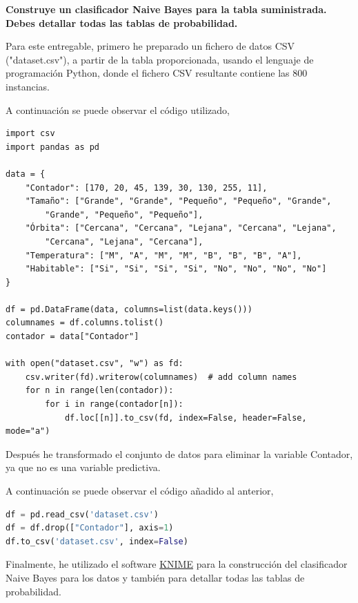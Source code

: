 \documentclass[11pt]{exam}
\begin{document}
\begin{questions}
	
{\bf \question Construye un clasificador Naive Bayes para la tabla suministrada. Debes detallar todas las tablas de probabilidad.}

Para este entregable, primero he preparado un fichero de datos CSV ("dataset.csv"), a partir de la tabla proporcionada, usando el lenguaje de programación Python, donde el fichero CSV resultante contiene las 800 instancias.

A continuación se puede observar el código utilizado,

\newpage

\begin{lstlisting}[basicstyle=\small, tabsize=2]
import csv
import pandas as pd

data = {
	"Contador": [170, 20, 45, 139, 30, 130, 255, 11],
	"Tamaño": ["Grande", "Grande", "Pequeño", "Pequeño", "Grande", 
		"Grande", "Pequeño", "Pequeño"],
	"Órbita": ["Cercana", "Cercana", "Lejana", "Cercana", "Lejana", 
		"Cercana", "Lejana", "Cercana"],
	"Temperatura": ["M", "A", "M", "M", "B", "B", "B", "A"],
	"Habitable": ["Si", "Si", "Si", "Si", "No", "No", "No", "No"]
}

df = pd.DataFrame(data, columns=list(data.keys()))
columnames = df.columns.tolist()
contador = data["Contador"]

with open("dataset.csv", "w") as fd:
	csv.writer(fd).writerow(columnames)  # add column names
	for n in range(len(contador)):
		for i in range(contador[n]):
			df.loc[[n]].to_csv(fd, index=False, header=False, mode="a")
\end{lstlisting}

Después he transformado el conjunto de datos para eliminar la variable Contador, ya que no es una variable predictiva.

A continuación se puede observar el código añadido al anterior,

\begin{lstlisting}[language=Python, basicstyle=\small, tabsize=2]
df = pd.read_csv('dataset.csv')
df = df.drop(["Contador"], axis=1)
df.to_csv('dataset.csv', index=False)
\end{lstlisting}

Finalmente, he utilizado el software \href{https://www.knime.com/}{KNIME} para la construcción del clasificador Naive Bayes para los datos y también para detallar todas las tablas de probabilidad.


\end{questions}
\end{document}
